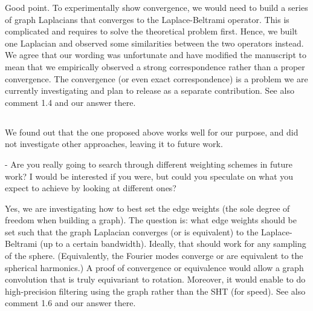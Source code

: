 \documentclass[12pt,a4paper]{article}
\newcommand{\nati}[1]{{\color[rgb]{.1,.6,.1}{NP: #1}}}
\newcommand{\mdeff}[1]{{\color[rgb]{.1,.6,.1}{MD: #1}}}
\newcommand{\todo}[1]{{\color[rgb]{.6,.1,.6}{TODO: #1}}}
\newcommand{\1}{\b{1}}              %
\newcommand{\0}{\b{0}}              %
\begin{document}
Good point.
To experimentally show convergence, we would need to build a series of graph Laplacians that converges to the Laplace-Beltrami operator.
This is complicated and requires to solve the theoretical problem first.
Hence, we built one Laplacian and observed some similarities between the two operators instead.
We agree that our wording was unfortunate and have modified the manuscript to mean that we empirically observed a strong correspondence rather than a proper convergence.
The convergence (or even exact correspondence) is a problem we are currently investigating and plan to release as a separate contribution.
See also comment 1.4 and our answer there.

\todo{the new figure A.12 is maybe a weak proof of convergence}

\mdeff{@nati, what do you think?} \nati{I like it. I totally agree with the new wording.}


\subsection{}

\begin{mdframed}[style=comment]
We found out that the one proposed above works well for our purpose, and did not investigate other approaches, leaving it to future work.

- Are you really going to search through different weighting schemes in future work? I would be interested if you were, but could you speculate on what you expect to achieve by looking at different ones?
\end{mdframed}

Yes, we are investigating how to best set the edge weights (the sole degree of freedom when building a graph).
The question is: what edge weights should be set such that the graph Laplacian converges (or is equivalent) to the Laplace-Beltrami (up to a certain bandwidth).
Ideally, that should work for any sampling of the sphere.
(Equivalently, the Fourier modes converge or are equivalent to the spherical harmonics.)
A proof of convergence or equivalence would allow a graph convolution that is truly equivariant to rotation.
Moreover, it would enable to do high-precision filtering using the graph rather than the SHT (for speed).
See also comment 1.6 and our answer there.

\end{document}
